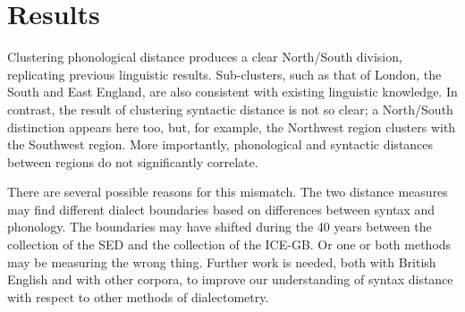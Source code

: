 \documentclass[11pt,letterpaper]{article}
\begin{document}
\section{Results}
Clustering phonological distance produces a clear North/South division, replicating
previous linguistic results. Sub-clusters, such as that of London, the
South and East England, are also consistent with existing linguistic
knowledge. In contrast, the result of clustering syntactic distance is not so clear; a
North/South distinction appears here too, but, for example, the
Northwest region clusters with the Southwest region. More importantly,
phonological and syntactic distances between regions do not
significantly correlate.

There are several possible reasons for this mismatch. The two distance
measures may find different dialect boundaries based on differences
between syntax and phonology. The boundaries may have shifted during
the 40 years between the collection of the SED and the collection of
the ICE-GB. Or one or both methods may be measuring the wrong
thing. Further work is needed, both with British English and with
other corpora, to improve our understanding of syntax distance with
respect to other methods of dialectometry.



\end{document}
